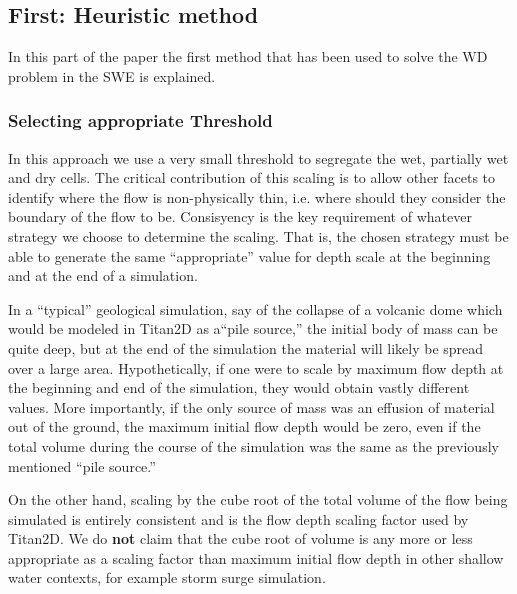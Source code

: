 \documentclass[letterpaper,10pt]{article}
\begin{document}
\subsection{First: Heuristic method} \label{Heuristic}
In this part of the paper the first method that has been used to solve the WD problem in the SWE is explained.
\subsubsection{Selecting appropriate Threshold} \label{Threshold}
In this approach we use a very small threshold to segregate the wet, partially wet and dry cells.
The critical contribution of this scaling is to allow other
facets to identify where the flow %
is non-physically thin, i.e. where should they consider the boundary of
the flow to be. Consisyency is the key requirement of whatever strategy we choose to
determine the scaling. That is, the
chosen strategy must be able to generate the same ``appropriate'' value
for depth scale at the beginning and at the end of a simulation.  \newline

In a ``typical'' geological simulation, say of the collapse of a volcanic 
dome which would be modeled in Titan2D as a``pile source,'' the initial 
body of mass can be quite deep, but at the end of the simulation the 
material will likely be spread over a large area.  Hypothetically, if one 
were to scale by maximum flow depth at the beginning and end of the 
simulation, they would obtain vastly different values.  More importantly, 
if the only source of mass was an effusion of material out of the ground, 
the maximum initial flow depth would be zero, even if the total volume 
during the course of the simulation was the same as the previously 
mentioned ``pile source.''  \newline

On the other hand, scaling by the cube root of the total volume of the 
flow being simulated is entirely consistent and is the flow depth 
scaling factor used by Titan2D.  We do {\bf not} claim that the cube root 
of volume is any more or less appropriate as a scaling factor than 
maximum initial flow depth in other shallow water contexts, for example 
storm surge simulation.\newline
\end{document}

